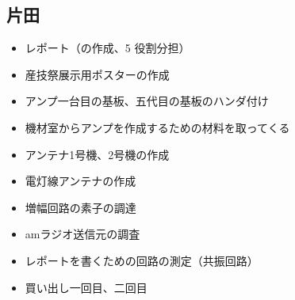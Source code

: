 \documentclass[report.tex]{subfiles}
\begin{document}
\subsection{片田}

\begin{itemize}
	\item レポート（の作成、5 役割分担）
	\item 産技祭展示用ポスターの作成
	\item アンプ一台目の基板、五代目の基板のハンダ付け
	\item 機材室からアンプを作成するための材料を取ってくる
	\item アンテナ1号機、2号機の作成
	\item 電灯線アンテナの作成
	\item 増幅回路の素子の調達
	\item amラジオ送信元の調査
	\item レポートを書くための回路の測定（共振回路）
	\item 買い出し一回目、二回目
\end{itemize}
\end{document}
